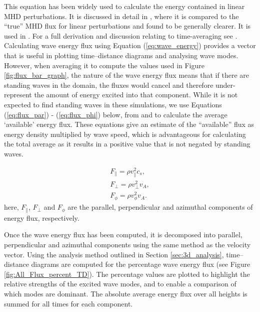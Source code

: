 This equation has been widely used to calculate the energy contained in linear MHD perturbations.
 It is discussed in detail in \cite{bogdan2003}, where it is compared to the ``true'' MHD flux for linear perturbations and found to be generally clearer. 
 It is used in \cite{vigeesh2009, vigeesh2012, khomenko2012}. 
 For a full derivation and discussion relating to time-averaging see \cite{leroy1985}.
 Calculating wave energy flux using Equation (\ref{eq:wave_energy}) provides a vector that is useful in plotting time--distance diagrams and analysing wave modes.
 However, when averaging it to compute the values used in Figure \ref{fig:flux_bar_graph}, the nature of the wave energy flux means that if there are standing waves in the domain, the fluxes would cancel and therefore under-represent the amount of energy excited into that component.
 While it is not expected to find standing waves in these simulations, we use Equations (\ref{eq:flux_par}) - (\ref{eq:flux_phi}) below, from \citet{vigeesh2012} and \citet{khomenko2012} to calculate the average `available' energy flux.
 These equations give an estimate of the ``available'' flux as energy density multiplied by wave speed, which is advantageous for calculating the total average as it results in a positive value that is not negated by standing waves.
 
 \begin{align}
 	F_\parallel = \rho v_\parallel^2 c_s,\label{eq:flux_par}\\
 	F_\perp = \rho v_\perp^2 v_A,\label{eq:flux_perp}\\
 	F_\phi = \rho v_\phi^2v_A.\label{eq:flux_phi}
 \end{align}
 here, $F_\parallel$, $F_\perp$ and $F_\phi$ are the parallel, perpendicular and azimuthal components of energy flux, respectively.

Once the wave energy flux has been computed, it is decomposed into parallel, perpendicular and azimuthal components using the same method as the velocity vector. 
 Using the analysis method outlined in Section \ref{sec:3d_analysis}, time--distance diagrams are computed for the percentage wave energy flux (see Figure \ref{fig:All_Flux_percent_TD}). 
 The percentage values are plotted to highlight the relative strengths of the excited wave modes, and to enable a comparison of which modes are dominant. 
 The absolute average energy flux over all heights is summed for all times for each component.


